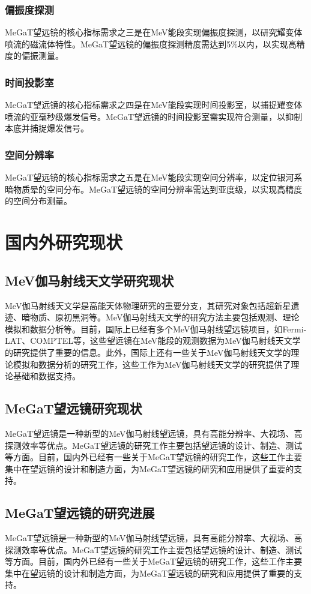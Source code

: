 \subsubsection{偏振度探测}
	MeGaT望远镜的核心指标需求之三是在MeV能段实现偏振度探测，以研究耀变体喷流的磁流体特性。MeGaT望远镜的偏振度探测精度需达到5\%以内，以实现高精度的偏振测量。
\subsubsection{时间投影室}
	MeGaT望远镜的核心指标需求之四是在MeV能段实现时间投影室，以捕捉耀变体喷流的亚毫秒级爆发信号。MeGaT望远镜的时间投影室需实现符合测量，以抑制本底并捕捉爆发信号。
\subsubsection{空间分辨率}
	MeGaT望远镜的核心指标需求之五是在MeV能段实现空间分辨率，以定位银河系暗物质晕的空间分布。MeGaT望远镜的空间分辨率需达到亚度级，以实现高精度的空间分布测量。
\section{国内外研究现状}
\label{sec:status}
\subsection{MeV伽马射线天文学研究现状}
MeV伽马射线天文学是高能天体物理研究的重要分支，其研究对象包括超新星遗迹、暗物质、原初黑洞等。MeV伽马射线天文学的研究方法主要包括观测、理论模拟和数据分析等。目前，国际上已经有多个MeV伽马射线望远镜项目，如Fermi-LAT、COMPTEL等，这些望远镜在MeV能段的观测数据为MeV伽马射线天文学的研究提供了重要的信息。此外，国际上还有一些关于MeV伽马射线天文学的理论模拟和数据分析的研究工作，这些工作为MeV伽马射线天文学的研究提供了理论基础和数据支持。\par
\subsection{MeGaT望远镜研究现状}
MeGaT望远镜是一种新型的MeV伽马射线望远镜，具有高能分辨率、大视场、高探测效率等优点。MeGaT望远镜的研究工作主要包括望远镜的设计、制造、测试等方面。目前，国内外已经有一些关于MeGaT望远镜的研究工作，这些工作主要集中在望远镜的设计和制造方面，为MeGaT望远镜的研究和应用提供了重要的支持。\par
\subsection{MeGaT望远镜的研究进展}	
MeGaT望远镜是一种新型的MeV伽马射线望远镜，具有高能分辨率、大视场、高探测效率等优点。MeGaT望远镜的研究工作主要包括望远镜的设计、制造、测试等方面。目前，国内外已经有一些关于MeGaT望远镜的研究工作，这些工作主要集中在望远镜的设计和制造方面，为MeGaT望远镜的研究和应用提供了重要的支持。\par
